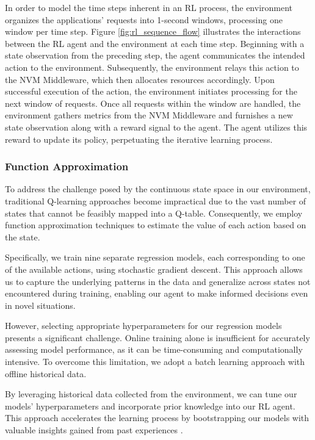 In order to model the time steps inherent in an RL process, the environment organizes the applications' requests into 1-second windows, processing one window per time step. Figure \ref{fig:rl_sequence_flow} illustrates the interactions between the RL agent and the environment at each time step. Beginning with a state observation from the preceding step, the agent communicates the intended action to the environment. Subsequently, the environment relays this action to the NVM Middleware, which then allocates resources accordingly. Upon successful execution of the action, the environment initiates processing for the next window of requests. Once all requests within the window are handled, the environment gathers metrics from the NVM Middleware and furnishes a new state observation along with a reward signal to the agent. The agent utilizes this reward to update its policy, perpetuating the iterative learning process.

\subsubsection{Function Approximation}

To address the challenge posed by the continuous state space in our environment, traditional Q-learning approaches become impractical due to the vast number of states that cannot be feasibly mapped into a Q-table. Consequently, we employ function approximation techniques to estimate the value of each action based on the state.

Specifically, we train nine separate regression models, each corresponding to one of the available actions, using stochastic gradient descent. This approach allows us to capture the underlying patterns in the data and generalize across states not encountered during training, enabling our agent to make informed decisions even in novel situations.

However, selecting appropriate hyperparameters for our regression models presents a significant challenge. Online training alone is insufficient for accurately assessing model performance, as it can be time-consuming and computationally intensive. To overcome this limitation, we adopt a batch learning approach with offline historical data.

By leveraging historical data collected from the environment, we can tune our models' hyperparameters and incorporate prior knowledge into our RL agent. This approach accelerates the learning process by bootstrapping our models with valuable insights gained from past experiences \cite{cano2017curator,vukosi2015improved}.

